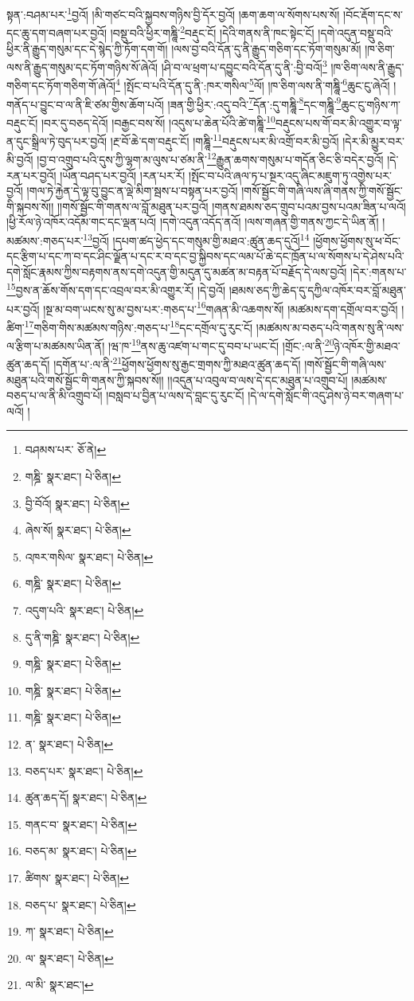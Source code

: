 སྟན་:བཤམ་པར་\footnote{བཤམས་པར་  ཅོ་ནེ། }བྱའོ། །མི་གཙང་བའི་སྐྱབས་གཉིས་བྱི་དོར་བྱའོ། །ཆག་ཆག་ལ་སོགས་པས་སོ། །བོང་རྡོག་དང་ས་དང་ཆུ་དག་བཞག་པར་བྱའོ། །བསྡུ་བའི་ཕྱིར་གཎྜཱི་\footnote{གཎྜི་  སྣར་ཐང་།  པེ་ཅིན། }བརྡུང་ངོ། །དེའི་གནས་ནི་ཁང་སྟེང་ངོ། །དགེ་འདུན་བསྡུ་བའི་ཕྱིར་ནི་རྒྱུད་གསུམ་དང་དེ་སྙེད་ཀྱི་ཏོག་དག་གོ། །ལས་བྱ་བའི་དོན་དུ་ནི་རྒྱུད་གཅིག་དང་ཏོག་གསུམ་མོ། །ཁ་ཅིག་ལས་ནི་རྒྱུད་གསུམ་དང་ཏོག་གཉིས་སོ་ཞེའོ། །ཤི་བ་ལ་ཕྲག་པ་དབྱུང་བའི་དོན་དུ་ནི་:བྱི་བའོ།\footnote{བྱི་བོའོ།  སྣར་ཐང་།  པེ་ཅིན། } །ཁ་ཅིག་ལས་ནི་རྒྱུད་གཅིག་དང་ཏོག་གཅིག་གོ་ཞེའོ།\footnote{ཞེས་སོ།  སྣར་ཐང་།  པེ་ཅིན། } །སྤོང་བ་པའི་དོན་དུ་ནི་:ཁར་གསིལ་\footnote{འཁར་གསིལ་  སྣར་ཐང་།  པེ་ཅིན། }ལོ། །ཁ་ཅིག་ལས་ནི་གཎྜཱི་\footnote{གཎྜི་  སྣར་ཐང་།  པེ་ཅིན། }ཆུང་ངུ་ཞེའོ། །གནོད་པ་བྱུང་བ་ལ་ནི་ཇི་ཙམ་གྱིས་ཆོག་པའོ། །ཟན་གྱི་ཕྱིར་:འདུ་བའི་\footnote{འདུག་པའི་  སྣར་ཐང་།  པེ་ཅིན། }དོན་:དུ་གཎྜཱི་\footnote{དུ་ནི་གཎྜི་  སྣར་ཐང་།  པེ་ཅིན། }དང་གཎྜཱི་\footnote{གཎྜི་  སྣར་ཐང་།  པེ་ཅིན། }ཆུང་ངུ་གཉིས་ཀ་བརྡུང་ངོ། །བར་དུ་བཅད་དེའོ། །བརྒྱང་བས་སོ། །འདུས་པ་ཆེན་པོའི་ཚེ་གཎྜཱི་\footnote{གཎྜི་  སྣར་ཐང་།  པེ་ཅིན། }བརྡུངས་པས་གོ་བར་མི་འགྱུར་བ་ལྟ་ན་དུང་སྒྲིལ་ཏེ་བུད་པར་བྱའོ། །རྔ་བོ་ཆེ་དག་བརྡུང་ངོ། །གཎྜཱི་\footnote{གཎྜི་  སྣར་ཐང་།  པེ་ཅིན། }བརྡུངས་པར་མི་འགྲོ་བར་མི་བྱའོ། །དེར་མི་མྱུར་བར་མི་བྱའོ། །བྱ་བ་འགྲུབ་པའི་དུས་ཀྱི་ལྷག་མ་ལུས་པ་ཙམ་ནི་\footnote{ན་  སྣར་ཐང་།  པེ་ཅིན། }རྒྱུན་ཆགས་གསུམ་པ་གདོན་ཅིང་ཅི་བདེར་བྱའོ། །དེ་རན་པར་བྱའོ། །ཡོན་བཤད་པར་བྱའོ། །རན་པར་རོ། །སྤོང་བ་པའི་ཞལ་ཏ་པ་སྔར་འདུ་ཞིང་མཇུག་ཏུ་འགྱེས་པར་བྱའོ། །གལ་ཏེ་རྐྱེན་དེ་ལྟ་བུ་བྱུང་ན་ལྡེ་མིག་སྦས་པ་བསྟན་པར་བྱའོ། །གསོ་སྦྱོང་གི་གཞི་ལས་ཞི་གནས་ཀྱི་གསོ་སྦྱོང་གི་སྐབས་སོ།། །།གསོ་སྦྱོང་གི་གནས་ལ་བློ་མཐུན་པར་བྱའོ། །གནས་ཐམས་ཅད་གྲུབ་པའམ་བྱས་པའམ་ཟིན་པ་ལའོ། །ཕྱི་རོལ་ཉེ་འཁོར་འདོམ་གང་དང་ལྡན་པའོ། །དགེ་འདུན་འདོད་ནའོ། །ལས་གཞན་གྱི་གནས་ཀྱང་དེ་ཡིན་ནོ། །མཚམས་:གཅད་པར་\footnote{བཅད་པར་  སྣར་ཐང་།  པེ་ཅིན། }བྱའོ། །དཔག་ཚད་ཕྱེད་དང་གསུམ་གྱི་མཐའ་:ཚུན་ཆད་དུའོ།\footnote{ཚུན་ཆད་དོ།  སྣར་ཐང་།  པེ་ཅིན། } །ཕྱོགས་ཕྱོགས་སུ་ཕ་བོང་དང་རྩིག་པ་དང་ཀ་བ་དང་ཤིང་ལྗོན་པ་དང་ར་བ་དང་བྱ་སྐྱིབས་དང་ལམ་པོ་ཆེ་དང་ཁྲོན་པ་ལ་སོགས་པ་དེ་ཤེས་པའི་དགེ་སློང་རྣམས་ཀྱིས་བརྟགས་ནས་དགེ་འདུན་གྱི་མདུན་དུ་མཚན་མ་བརྟན་པོ་བརྗོད་དེ་ལས་བྱའོ། །དེར་:གནས་པ་\footnote{གནང་བ་  སྣར་ཐང་།  པེ་ཅིན། }བྱས་ན་ཆོས་གོས་དག་དང་འབྲལ་བར་མི་འགྱུར་རོ། །དེ་བྱའོ། །ཐམས་ཅད་ཀྱི་ཆེད་དུ་དཀྱིལ་འཁོར་བར་བློ་མཐུན་པར་བྱའོ། །སྔ་མ་བག་ཡངས་སུ་མ་བྱས་པར་:གཅད་པ་\footnote{བཅད་མ་  སྣར་ཐང་།  པེ་ཅིན། }གཞན་མི་འཆགས་སོ། །མཚམས་དག་དགྲོལ་བར་བྱའོ། །ཚིག་\footnote{ཚིགས་  སྣར་ཐང་།  པེ་ཅིན། }གཅིག་གིས་མཚམས་གཉིས་:གཅད་པ་\footnote{བཅད་པ་  སྣར་ཐང་།  པེ་ཅིན། }དང་དགྲོལ་དུ་རུང་ངོ། །མཚམས་མ་བཅད་པའི་གནས་སུ་ནི་ལས་ལ་རྩིག་པ་མཚམས་ཡིན་ནོ། །ཝ་ཁ་\footnote{ཀ་  སྣར་ཐང་།  པེ་ཅིན། }ནས་ཆུ་འཛག་པ་གང་དུ་བབ་པ་ཡང་ངོ། །གྲོང་:ལ་ནི་\footnote{ལ་  སྣར་ཐང་།  པེ་ཅིན། }ཉེ་འཁོར་གྱི་མཐའ་ཚུན་ཆད་དོ། །དགོན་པ་:ལ་ནི་\footnote{ལ་མི་  སྣར་ཐང་། }ཕྱོགས་ཕྱོགས་སུ་རྒྱང་གྲགས་ཀྱི་མཐའ་ཚུན་ཆད་དོ། །གསོ་སྦྱོང་གི་གཞི་ལས་མཐུན་པའི་གསོ་སྦྱོང་གི་གནས་ཀྱི་སྐབས་སོ།། །།འདུན་པ་འབུལ་བ་ལས་དེ་དང་མཐུན་པ་འགྲུབ་པོ། །མཚམས་བཅད་པ་ལ་ནི་མི་འགྲུབ་པོ། །བསླབ་པ་བྱིན་པ་ལས་དེ་བླང་དུ་རུང་ངོ། །དེ་ལ་དགེ་སློང་གི་འདུ་ཤེས་ཉེ་བར་གཞག་པ་ལའོ། །
